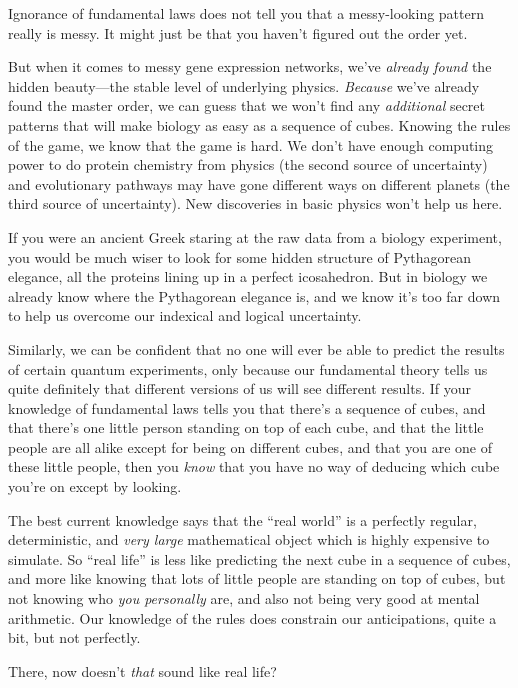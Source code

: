 {
 Ignorance of fundamental laws does not tell you that a
messy-looking pattern really is messy. It might just be that you
haven't figured out the order yet.}

{
 But when it comes to messy gene expression networks,
we've \textit{already found} the hidden beauty---the
stable level of underlying physics. \textit{Because}
we've already found the master order, we can guess that
we won't find any \textit{additional} secret patterns
that will make biology as easy as a sequence of cubes. Knowing the
rules of the game, we know that the game is hard. We
don't have enough computing power to do protein
chemistry from physics (the second source of uncertainty) and
evolutionary pathways may have gone different ways on different planets
(the third source of uncertainty). New discoveries in basic physics
won't help us here.}

{
 If you were an ancient Greek staring at the raw data from a
biology experiment, you would be much wiser to look for some hidden
structure of Pythagorean elegance, all the proteins lining up in a
perfect icosahedron. But in biology we already know where the
Pythagorean elegance is, and we know it's too far down
to help us overcome our indexical and logical uncertainty.}

{
 Similarly, we can be confident that no one will ever be able to
predict the results of certain quantum experiments, only because our
fundamental theory tells us quite definitely that different versions of
us will see different results. If your knowledge of fundamental laws
tells you that there's a sequence of cubes, and that
there's one little person standing on top of each cube,
and that the little people are all alike except for being on different
cubes, and that you are one of these little people, then you
\textit{know} that you have no way of deducing which cube
you're on except by looking.}

{
 The best current knowledge says that the ``real
world'' is a perfectly regular, deterministic, and
\textit{very large} mathematical object which is highly expensive to
simulate. So ``real life'' is less
like predicting the next cube in a sequence of cubes, and more like
knowing that lots of little people are standing on top of cubes, but
not knowing who \textit{you personally} are, and also not being very
good at mental arithmetic. Our knowledge of the rules does constrain
our anticipations, quite a bit, but not perfectly.}

{
 There, now doesn't \textit{that} sound like real
life?}


